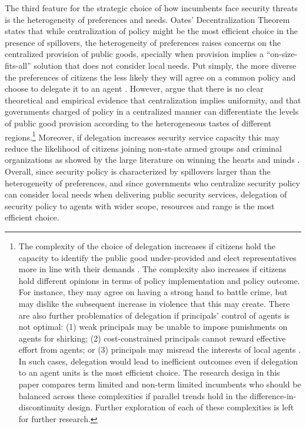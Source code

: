 The third feature for the strategic choice of how incumbents face security threats is the heterogeneity of preferences and needs. Oates' \citeyear{oates_1972} Decentralization Theorem states that while centralization of policy might be the most efficient choice in the presence of spillovers, the heterogeneity of preferences raises concerns on the centralized provision of public goods, specially when provision implies a ``on-size-fits-all'' solution that does not consider local needs. Put simply, the more diverse the preferences of citizens the less likely they will agree on a common policy and choose to delegate it to an agent \citep{martin_2006, lyne_etal_2006}. However, \citet{besley_coate_2003} argue that there is no clear theoretical and empirical evidence that centralization implies uniformity, and that governments charged of policy in a centralized manner can differentiate the levels of public good provision according to the heterogeneous tastes of different regions.\footnote{The complexity of the choice of delegation increases if citizens hold the capacity to identify the public good under-provided and elect representatives more in line with their demands \citet{besley_coate_2003}. The complexity also increases if citizens hold different opinions in terms of policy implementation and policy outcome. For instance, they may agree on having a strong hand to battle crime, but may dislike the subsequent increase in violence that this may create. There are also further problematics of delegation if principals' control of agents is not optimal: (1) weak principals may be unable to impose punishments on agents for shirking; (2) cost-constrained principals cannot reward effective effort from agents; or (3) principals may misread the interests of local agents \citep{berman_lake_2019}. In such cases, delegation would lead to inefficient outcomes even if delegation to an agent units is the most efficient choice. The research design in this paper compares term limited and non-term limited incumbents who should be balanced across these complexities if parallel trends hold in the difference-in-discontinuity design. Further exploration of each of these complexities is left for further research.} Moreover, if delegation increases security service capacity this may reduce the likelihood of citizens joining non-state armed groups and criminal organizations as showed by the large literature on winning the hearts and minds \citep{beath_etal_2013, berman_etal_2011, dell_querubin_2018}. Overall, since security policy is characterized by  spillovers larger than the heterogeneity of preferences, and since governments who centralize security policy can consider local needs when delivering public security services, delegation of security policy to agents with wider scope, resources and range is the most efficient choice. 

